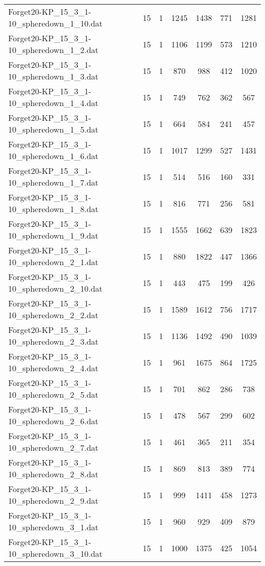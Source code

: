 \begin{table}[!ht]
\begin{tabular}{lcccccc}
Forget20-KP\_15\_3\_1-10\_spheredown\_1\_10.dat & 15 & 1 & 1245 & 1438 & 771 & 1281 \\
Forget20-KP\_15\_3\_1-10\_spheredown\_1\_2.dat & 15 & 1 & 1106 & 1199 & 573 & 1210 \\
Forget20-KP\_15\_3\_1-10\_spheredown\_1\_3.dat & 15 & 1 & 870 & 988 & 412 & 1020 \\
Forget20-KP\_15\_3\_1-10\_spheredown\_1\_4.dat & 15 & 1 & 749 & 762 & 362 & 567 \\
Forget20-KP\_15\_3\_1-10\_spheredown\_1\_5.dat & 15 & 1 & 664 & 584 & 241 & 457 \\
Forget20-KP\_15\_3\_1-10\_spheredown\_1\_6.dat & 15 & 1 & 1017 & 1299 & 527 & 1431 \\
Forget20-KP\_15\_3\_1-10\_spheredown\_1\_7.dat & 15 & 1 & 514 & 516 & 160 & 331 \\
Forget20-KP\_15\_3\_1-10\_spheredown\_1\_8.dat & 15 & 1 & 816 & 771 & 256 & 581 \\
Forget20-KP\_15\_3\_1-10\_spheredown\_1\_9.dat & 15 & 1 & 1555 & 1662 & 639 & 1823 \\
Forget20-KP\_15\_3\_1-10\_spheredown\_2\_1.dat & 15 & 1 & 880 & 1822 & 447 & 1366 \\
Forget20-KP\_15\_3\_1-10\_spheredown\_2\_10.dat & 15 & 1 & 443 & 475 & 199 & 426 \\
Forget20-KP\_15\_3\_1-10\_spheredown\_2\_2.dat & 15 & 1 & 1589 & 1612 & 756 & 1717 \\
Forget20-KP\_15\_3\_1-10\_spheredown\_2\_3.dat & 15 & 1 & 1136 & 1492 & 490 & 1039 \\
Forget20-KP\_15\_3\_1-10\_spheredown\_2\_4.dat & 15 & 1 & 961 & 1675 & 864 & 1725 \\
Forget20-KP\_15\_3\_1-10\_spheredown\_2\_5.dat & 15 & 1 & 701 & 862 & 286 & 738 \\
Forget20-KP\_15\_3\_1-10\_spheredown\_2\_6.dat & 15 & 1 & 478 & 567 & 299 & 602 \\
Forget20-KP\_15\_3\_1-10\_spheredown\_2\_7.dat & 15 & 1 & 461 & 365 & 211 & 354 \\
Forget20-KP\_15\_3\_1-10\_spheredown\_2\_8.dat & 15 & 1 & 869 & 813 & 389 & 774 \\
Forget20-KP\_15\_3\_1-10\_spheredown\_2\_9.dat & 15 & 1 & 999 & 1411 & 458 & 1273 \\
Forget20-KP\_15\_3\_1-10\_spheredown\_3\_1.dat & 15 & 1 & 960 & 929 & 409 & 879 \\
Forget20-KP\_15\_3\_1-10\_spheredown\_3\_10.dat & 15 & 1 & 1000 & 1375 & 425 & 1054 \\

\end{tabular}
\end{table}

